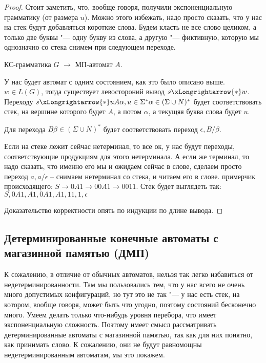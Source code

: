 \begin{proof}
    Стоит заметить, что, вообще говоря, получили экспоненциальную грамматику (от размера $u$). 
    Можно этого избежать, надо просто сказать, что у нас на стек будут добавляться короткие слова. 
    Будем класть не все слово целиком, а только две буквы "--- одну букву из слова, а другую "--- фиктивную, которую мы однозначно со стека снимем при следующем переходе.

    КС-грамматика $G$ $\to$ МП-автомат $A$.

    У нас будет автомат с одним состоянием, как это было описано выше.
    $w \in L(G)$, тогда существует левостороний вывод $s \xLongrightarrow{*} w$. 
    Переходу $s \xLongrightarrow{*} uA\alpha, u \in \Sigma^* \alpha \in (\Sigma \cup N)^*$ будет соответствовать стек, 
    на вершине которого будет $A$, а потом $\alpha$, а текущяя буква слова будет $u$.  %

    Для перехода $B \beta \in (\Sigma \cup N)^*$ будет соответствовать переход $\epsilon, B/\beta$.
    
    Если на стеке лежит сейчас нетерминал, то все ок, у нас будут переходы, соответствующие продукциям для этого нетерминала.
    А если же терминал, то надо сказать, что именно его мы и ожидаем сейчас в слове, сделаем просто переход $a, a/\epsilon$ -- снимаем нетерминал со стека, и читаем его в слове.
    \TODO примерчик происходящего: $S \to 0A1 \to 00A1 \to 0011$. Стек будет выглядеть так: $S, 0A1, A1 ,0A1, A1, 11, 1, \epsilon$

    Доказательство корректности опять по индукции по длине вывода.
\end{proof}          

\subsection{Детерминированные конечные автоматы с магазинной памятью (ДМП)}
К сожалению, в отличие от обычных автоматов, нельзя так легко избавиться от недетерминированности. 
Там мы пользовались тем, что у нас всего не очень много допустимых конфигураций, но тут это не так "--- у нас есть стек, на котором, вообще говоря, может быть что угодно, поэтому состояний бесконечно много.
Умеем делать только что-нибудь уровня перебора, что имеет экспоненциальную сложность.
Поэтому имеет смысл рассматривать детерминированные автоматы с магазинной памятью, так как для них понятно, как принимать слово.
К сожалению, они не будут равномощны недетерминированным автоматам, мы это покажем.


